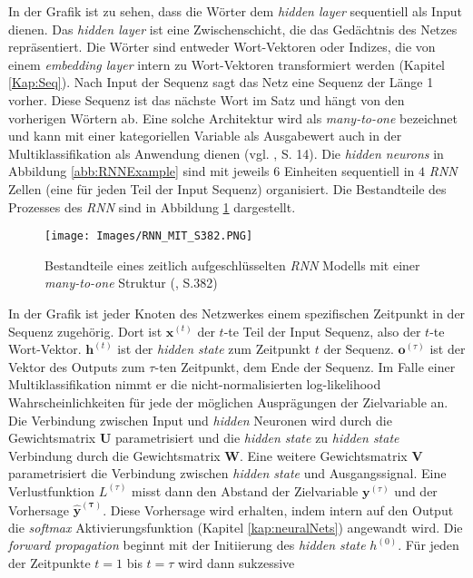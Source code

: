 \documentclass[a4paper,11pt]{article}
\begin{document}
In der Grafik ist zu sehen, dass die Wörter dem \textit{hidden layer} sequentiell als Input dienen. Das \textit{hidden layer} ist eine Zwischenschicht, die das Gedächtnis des Netzes repräsentiert. Die Wörter sind entweder Wort-Vektoren oder Indizes, die von einem \textit{embedding layer} intern zu Wort-Vektoren transformiert werden (Kapitel \ref{Kap:Seq}). Nach Input der Sequenz  sagt das Netz eine Sequenz der Länge 1 vorher. Diese Sequenz ist das nächste Wort im Satz und hängt von den vorherigen Wörtern ab. 
Eine solche Architektur wird als \textit{many-to-one}
bezeichnet und kann mit einer kategoriellen Variable als Ausgabewert auch in der Multiklassifikation als Anwendung dienen (vgl. \cite{deepEssentials}, S. 14). Die \textit{hidden neurons} in Abbildung \ref{abb:RNNExample} sind mit jeweils $6$ Einheiten sequentiell in $4$ \textit{RNN} Zellen (eine für jeden Teil der Input Sequenz) organisiert. Die Bestandteile des Prozesses des \textit{RNN} sind in Abbildung \ref{abb:RNNArch} dargestellt.

\begin{figure}[!ht]
\begin{center}
\texttt{[image: Images/RNN\_MIT\_S382.PNG]}
\caption{Bestandteile eines zeitlich aufgeschlüsselten \textit{RNN} Modells mit einer \textit{many-to-one} Struktur (\cite{deepL}, S.382)}
\label{abb:RNNArch}
\end{center}
\end{figure}

In der Grafik ist jeder Knoten des Netzwerkes einem spezifischen Zeitpunkt in der Sequenz zugehörig.
Dort ist $\bm{x}^{(t)}$ der $t$-te Teil der Input Sequenz, also der $t$-te Wort-Vektor. $\bm{h}^{(t)}$ ist der \textit{hidden state} zum Zeitpunkt $t$ der Sequenz. $\bm{o}^{(\tau)}$ ist der Vektor des Outputs zum $\tau$-ten Zeitpunkt, dem Ende der Sequenz. Im Falle einer Multiklassifikation nimmt er die nicht-normalisierten log-likelihood Wahrscheinlichkeiten für jede der möglichen Ausprägungen der Zielvariable an.
Die Verbindung zwischen Input und \textit{hidden} Neuronen wird durch die Gewichtsmatrix $\bm{U}$ parametrisiert und die \textit{hidden state} zu \textit{hidden state} Verbindung durch die Gewichtsmatrix $\bm{W}$. Eine weitere Gewichtsmatrix $\bm{V}$ parametrisiert die Verbindung zwischen \textit{hidden state} und Ausgangssignal. Eine Verlustfunktion $L^{(\tau)}$ misst dann den Abstand der Zielvariable $\bm{y}^{(\tau)}$ und der Vorhersage $\bm{\hat{y}^{(\tau)}}$. Diese Vorhersage wird erhalten, indem intern auf den Output die \textit{softmax} Aktivierungsfunktion (Kapitel \ref{kap:neuralNets}) angewandt wird. Die \textit{forward propagation} beginnt mit der Initiierung des \textit{hidden state} $h^{(0)}$. Für jeden der Zeitpunkte $t=1$ bis $t = \tau$ wird dann sukzessive 
\end{document}
